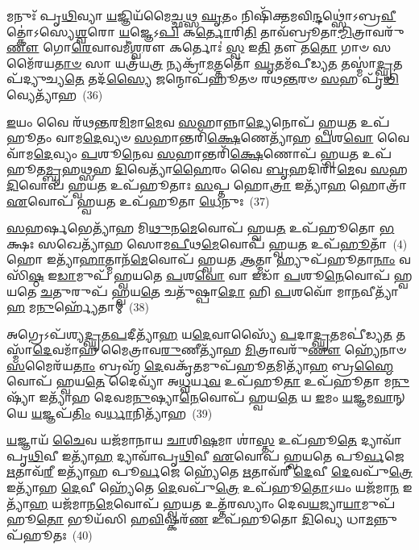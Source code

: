 {\anuvakamend[{\-\ul{𑌶}\-𑌪𑍍𑌤𑌃 𑌸𑍍𑌪᳴𑌰𑍍𑌶𑌯𑌤𑌿 \ul{𑌭𑍂}\-𑌤𑌾𑌨𑌾᳴\-\ul{𑌮}\-𑌗𑍍𑌨𑌿𑍞 \ul{𑌰𑍁}\-𑌦𑍍𑌰𑌸𑍍𑌯᳴ \ul{𑌸}\-𑌪𑍍𑌤𑌤𑍍𑌰𑌿𑍞᳴𑌶𑌚𑍍𑌚}]}%

𑌮𑌨𑍁𑌃᳴ 𑌪𑍃\-\ul{𑌥𑌿}\-𑌵𑍍𑌯𑌾 \ul{𑌯}\-𑌜𑍍𑌞𑌿𑌯᳴𑌮𑍈\-\ul{𑌚𑍍𑌛}\-𑌥𑍍𑌸 \ul{𑌘𑍃}\-𑌤𑌂 𑌨𑌿𑌷𑌿᳴𑌕𑍍𑌤𑌮𑌵𑌿\-\ul{𑌨𑍍𑌦}\-𑌥𑍍𑌸𑍋॑\-𑌽𑌬𑍍𑌰\-\ul{𑌵𑍀}\-𑌤𑍍𑌕𑍋॑\-𑌽𑌸𑍍𑌯𑍇\-\ul{𑌶𑍍𑌵}\-𑌰𑍋 \ul{𑌯}\-𑌜𑍍𑌞𑍇\-𑌽\-\ul{𑌪𑌿} 𑌕\-\ul{𑌰𑍍𑌤𑍋}\-𑌰𑌿\-\ul{𑌤𑌿} 𑌤𑌾𑌵᳴𑌬𑍍𑌰𑍂𑌤𑌾\-\ul{𑌮𑍍𑌮𑌿}\-𑌤𑍍𑌰𑌾𑌵𑌰𑍁᳴\-\ul{𑌣𑍗} 𑌗𑍋\-\ul{𑌰𑍇}\-𑌵𑌾𑌵𑌮𑍀॑\-\ul{𑌶𑍍𑌵}\-𑌰𑍗 𑌕𑌰𑍍𑌤𑍋𑌃॑ \ul{𑌸𑍍𑌵} 𑌇\-\ul{𑌤𑌿} 𑌤𑍗 𑌤\-\ul{𑌤𑍋} 𑌗𑌾𑍞 𑌸𑌮𑍈᳴𑌰𑌯\-\ul{𑌤𑌾}\-\-\ul{𑍞} 𑌸𑌾 𑌯𑌤𑍍𑌰᳴𑌯\-\ul{𑌤𑍍𑌰} 𑌨𑍍𑌯𑌕𑍍𑌰𑌾᳴\-\ul{𑌮}\-𑌤𑍍𑌤𑌤𑍋᳴ \ul{𑌘𑍃}\-𑌤𑌮᳴𑌪𑍀𑌡𑍍𑌯\-\ul{𑌤} 𑌤𑌸𑍍𑌮𑌾॑\-\ul{𑌦𑍍𑌘𑍃}\-𑌤𑌪᳴𑌦𑍍𑌯𑍁𑌚𑍍𑌯\-\ul{𑌤𑍇} 𑌤𑌦᳴\-\ul{𑌸𑍍𑌯𑍈} 𑌜𑌨𑍍𑌮𑍋𑌪᳴𑌹𑍂𑌤𑍞 𑌰𑌥\-\ul{𑌨𑍍𑌤}\-𑌰𑍞 \ul{𑌸}\-𑌹 𑌪𑍃᳴\-\ul{𑌥𑌿}\-𑌵𑍍𑌯𑍇𑌤𑍍𑌯𑌾᳴𑌹~(36)

\-\ul{𑌇}\-𑌯𑌂 𑌵𑍈 𑌰᳴𑌥\-\ul{𑌨𑍍𑌤}\-𑌰\-\ul{𑌮𑌿}\-𑌮𑌾\-\ul{𑌮𑍇}\-𑌵 \ul{𑌸}\-𑌹𑌾𑌨𑍍𑌨𑌾\-\ul{𑌦𑍍𑌯𑍇}\-𑌨𑍋𑌪᳴ 𑌹𑍍𑌵𑌯\-\ul{𑌤} 𑌉𑌪᳴𑌹𑍂𑌤𑌂 𑌵𑌾𑌮\-\ul{𑌦𑍇}\-𑌵𑍍𑌯𑍞 \ul{𑌸}\-𑌹𑌾𑌨𑍍𑌤𑌰𑌿᳴\-\ul{𑌕𑍍𑌷𑍇}\-𑌣𑍇𑌤𑍍𑌯𑌾᳴𑌹 \ul{𑌪}\-𑌶\-\ul{𑌵𑍋} 𑌵𑍈 𑌵𑌾᳴𑌮\-\ul{𑌦𑍇}\-𑌵𑍍𑌯𑌂 \ul{𑌪}\-𑌶𑍂\-\ul{𑌨𑍇}\-𑌵 \ul{𑌸}\-𑌹𑌾𑌨𑍍𑌤𑌰𑌿᳴\-\ul{𑌕𑍍𑌷𑍇}\-𑌣𑍋𑌪᳴ 𑌹𑍍𑌵𑌯\-\ul{𑌤} 𑌉𑌪᳴𑌹𑍂𑌤\-\ul{𑌮𑍍𑌬𑍃}\-𑌹\-\ul{𑌥𑍍𑌸}\-𑌹 \ul{𑌦𑌿}\-𑌵𑍇𑌤𑍍𑌯𑌾᳴\-\ul{𑌹𑍈}\-𑌰𑌂 𑌵𑍈 \ul{𑌬𑍃}\-𑌹𑌦𑌿𑌰𑌾᳴\-\ul{𑌮𑍇}\-𑌵 \ul{𑌸}\-𑌹 \ul{𑌦𑌿}\-𑌵𑍋𑌪᳴ 𑌹𑍍𑌵𑌯\-\ul{𑌤} 𑌉𑌪᳴𑌹𑍂𑌤𑌾𑌃 \ul{𑌸}\-𑌪𑍍𑌤 𑌹𑍋\-\ul{𑌤𑍍𑌰𑌾} 𑌇𑌤𑍍𑌯𑌾᳴\-\ul{𑌹} 𑌹𑍋𑌤𑍍𑌰𑌾᳴ \ul{𑌏}\-𑌵𑍋𑌪᳴ 𑌹𑍍𑌵𑌯\-\ul{𑌤} 𑌉𑌪᳴𑌹𑍂𑌤𑌾 \ul{𑌧𑍇}\-𑌨𑍁𑌃~(37)

\-\ul{𑌸}\-𑌹𑌰𑍍\mbox{}\-\ul{𑌷}\-𑌭𑍇𑌤𑍍𑌯𑌾᳴𑌹 𑌮𑌿\-\ul{𑌥𑍁}\-𑌨\-\ul{𑌮𑍇}\-𑌵𑍋𑌪᳴ 𑌹𑍍𑌵𑌯\-\ul{𑌤} 𑌉𑌪᳴𑌹𑍂𑌤𑍋 \ul{𑌭}\-𑌕𑍍𑌷𑌃 𑌸𑌖𑍇𑌤𑍍𑌯𑌾᳴𑌹 𑌸𑍋𑌮\-\ul{𑌪𑍀}\-𑌥\-\ul{𑌮𑍇}\-𑌵𑍋𑌪᳴ 𑌹𑍍𑌵𑌯\-\ul{𑌤} 𑌉𑌪᳴\-\ul{𑌹𑍂}\-𑌤𑌾𑌁~(4) 𑌹𑍋 𑌇𑌤𑍍𑌯𑌾᳴\-\ul{𑌹𑌾}\-𑌤𑍍𑌮𑌾𑌨᳴\-\ul{𑌮𑍇}\-𑌵𑍋𑌪᳴ 𑌹𑍍𑌵𑌯𑌤 \ul{𑌆}\-𑌤𑍍𑌮𑌾 𑌹𑍍𑌯𑍁𑌪᳴𑌹𑍂𑌤𑌾\-\ul{𑌨𑌾𑌂} 𑌵𑌸𑌿᳴\-\ul{𑌷𑍍𑌠} 𑌇\-\ul{𑌡𑌾}\-𑌮𑍁𑌪᳴ 𑌹𑍍𑌵𑌯𑌤𑍇 \ul{𑌪}\-𑌶\-\ul{𑌵𑍋} 𑌵𑌾 𑌇𑌡𑌾᳴ \ul{𑌪}\-𑌶𑍂\-\ul{𑌨𑍇}\-𑌵𑍋𑌪᳴ 𑌹𑍍𑌵𑌯𑌤𑍇 \ul{𑌚}\-𑌤𑍁𑌰𑍁𑌪᳴ 𑌹𑍍𑌵𑌯\-\ul{𑌤𑍇} 𑌚𑌤𑍁᳴𑌷𑍍𑌪𑌾\-\ul{𑌦𑍋} 𑌹𑌿 \ul{𑌪}\-𑌶𑌵𑍋᳴ 𑌮𑌾\-\ul{𑌨}\-𑌵𑍀𑌤𑍍𑌯𑌾᳴\-\ul{𑌹} 𑌮\-\ul{𑌨𑍁}\-𑌰𑍍\mbox{}𑌹𑍍𑌯𑍇᳴𑌤𑌾𑌮𑍍~(38)

𑌅𑌗𑍍𑌰𑍇\-𑌽𑌪᳴𑌶𑍍𑌯\-\ul{𑌦𑍍𑌘𑍃}\-𑌤\-\ul{𑌪}\-𑌦𑍀𑌤𑍍𑌯𑌾᳴\-\ul{𑌹} 𑌯\-\ul{𑌦𑍇}\-𑌵𑌾𑌸𑍍𑌯𑍈᳴ \ul{𑌪}\-𑌦𑌾\-\ul{𑌦𑍍𑌘𑍃}\-𑌤𑌮𑌪𑍀॑𑌡𑍍𑌯\-\ul{𑌤} 𑌤𑌸𑍍𑌮𑌾᳴\-\ul{𑌦𑍇}\-𑌵𑌮𑌾᳴𑌹 𑌮𑍈𑌤𑍍𑌰𑌾𑌵\-\ul{𑌰𑍁}\-𑌣𑍀𑌤𑍍𑌯𑌾᳴𑌹 \ul{𑌮𑌿}\-𑌤𑍍𑌰𑌾𑌵𑌰𑍁᳴\-\ul{𑌣𑍗} 𑌹𑍍𑌯𑍇᳴𑌨𑌾𑍞 \ul{𑌸}\-𑌮𑍈𑌰᳴𑌯\-\ul{𑌤𑌾𑌂} 𑌬𑍍𑌰𑌹𑍍𑌮᳴ \ul{𑌦𑍇}\-𑌵𑌕𑍃᳴\-\ul{𑌤}\-𑌮𑍁𑌪᳴𑌹𑍂\-\ul{𑌤}\-𑌮𑌿𑌤𑍍𑌯𑌾᳴\-\ul{𑌹} 𑌬𑍍𑌰\-\ul{𑌹𑍍𑌮𑍈}\-𑌵𑍋𑌪᳴ 𑌹𑍍𑌵𑌯\-\ul{𑌤𑍇} 𑌦𑍈𑌵𑍍𑌯𑌾᳴ 𑌅\-\ul{𑌧𑍍𑌵}\-𑌰𑍍𑌯\-\ul{𑌵} 𑌉𑌪᳴𑌹𑍂\-\ul{𑌤𑌾} 𑌉𑌪᳴𑌹𑍂𑌤𑌾 𑌮\-\ul{𑌨𑍁}\-𑌷𑍍𑌯𑌾᳴ 𑌇𑌤𑍍𑌯𑌾᳴𑌹 𑌦𑍇𑌵𑌮\-\ul{𑌨𑍁}\-𑌷𑍍𑌯𑌾\-\ul{𑌨𑍇}\-𑌵𑍋𑌪᳴ 𑌹𑍍𑌵𑌯\-\ul{𑌤𑍇} 𑌯 \ul{𑌇}\-𑌮𑌂 \ul{𑌯}\-𑌜𑍍𑌞𑌮\-\ul{𑌵𑌾}\-𑌨𑍍 𑌯𑍇 \ul{𑌯}\-𑌜𑍍𑌞𑌪᳴\-\ul{𑌤𑌿𑌂} 𑌵\-\ul{𑌰𑍍𑌧𑌾}\-𑌨𑌿𑌤𑍍𑌯𑌾᳴𑌹~(39)

\-\ul{𑌯}\-𑌜𑍍𑌞𑌾𑌯᳴ \ul{𑌚𑍈}\-𑌵 𑌯𑌜᳴𑌮𑌾𑌨𑌾𑌯 \ul{𑌚𑌾}\-𑌶𑌿\-\ul{𑌷}\-𑌮𑌾 𑌶𑌾॑\-\ul{𑌸𑍍𑌤} 𑌉𑌪᳴𑌹𑍂\-\ul{𑌤𑍇} 𑌦𑍍𑌯𑌾𑌵𑌾᳴𑌪𑍃\-\ul{𑌥𑌿}\-𑌵𑍀 𑌇𑌤𑍍𑌯𑌾᳴\-\ul{𑌹} 𑌦𑍍𑌯𑌾𑌵𑌾᳴𑌪𑍃\-\ul{𑌥𑌿}\-𑌵𑍀 \ul{𑌏}\-𑌵𑍋𑌪᳴ 𑌹𑍍𑌵𑌯𑌤𑍇 𑌪𑍂\-\ul{𑌰𑍍𑌵}\-𑌜𑍇 \ul{𑌋}\-𑌤𑌾𑌵᳴\-\ul{𑌰𑍀} 𑌇𑌤𑍍𑌯𑌾᳴𑌹 𑌪𑍂\-\ul{𑌰𑍍𑌵}\-𑌜𑍇 𑌹𑍍𑌯𑍇᳴𑌤𑍇 \ul{𑌋}\-𑌤𑌾𑌵᳴𑌰𑍀 \ul{𑌦𑍇}\-𑌵𑍀 \ul{𑌦𑍇}\-𑌵𑌪𑍁᳴\-\ul{𑌤𑍍𑌰𑍇} 𑌇𑌤𑍍𑌯𑌾᳴𑌹 \ul{𑌦𑍇}\-𑌵𑍀 𑌹𑍍𑌯𑍇᳴𑌤𑍇 \ul{𑌦𑍇}\-𑌵𑌪𑍁᳴\-\ul{𑌤𑍍𑌰𑍇} 𑌉𑌪᳴𑌹𑍂\-\ul{𑌤𑍋}\-\-𑌽𑌯𑌂 𑌯𑌜᳴𑌮𑌾\-\ul{𑌨} 𑌇𑌤𑍍𑌯𑌾᳴\-\ul{𑌹} 𑌯𑌜᳴𑌮𑌾𑌨\-\ul{𑌮𑍇}\-𑌵𑍋𑌪᳴ 𑌹𑍍𑌵𑌯\-\ul{𑌤} 𑌉𑌤𑍍𑌤᳴𑌰𑌸𑍍𑌯𑌾𑌂 𑌦𑍇𑌵\-\ul{𑌯}\-𑌜𑍍𑌯𑌾\-\ul{𑌯𑌾}\-𑌮𑍁𑌪᳴𑌹𑍂\-\ul{𑌤𑍋} 𑌭𑍂𑌯᳴𑌸𑌿 𑌹\-\ul{𑌵𑌿}\-𑌷𑍍𑌕𑌰᳴\-\ul{𑌣} 𑌉𑌪᳴𑌹𑍂𑌤𑍋 \ul{𑌦𑌿}\-𑌵𑍍𑌯𑍇 𑌧𑌾\-\ul{𑌮}\-𑌨𑍍𑌨𑍁𑌪᳴𑌹𑍂𑌤𑌃~(40)

